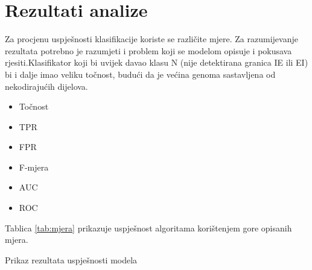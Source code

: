 \section{Rezultati analize}
\label{ch:ch5}


Za procjenu uspješnosti klasifikacije koriste se različite mjere. Za razumijevanje rezultata potrebno je razumjeti i problem koji se modelom opisuje i pokusava rjesiti.Klasifikator koji bi uvijek davao klasu N (nije detektirana granica IE ili EI) bi i dalje imao veliku točnost, budući da je većina genoma sastavljena od nekodirajućih dijelova.

\begin{itemize}
   \item Točnost 
   \item TPR
   \item FPR
   \item F-mjera
   \item AUC
   \item ROC
\end{itemize}


Tablica \ref{tab:mjera} prikazuje uspješnost algoritama korištenjem gore opisanih mjera.

\begin{table}[!ht]
    \centering
    \caption[Prikaz rezultata uspješnosti modela]{Prikaz rezultata uspješnosti modela}    
    \label{tab:mjera}

\end{table}
